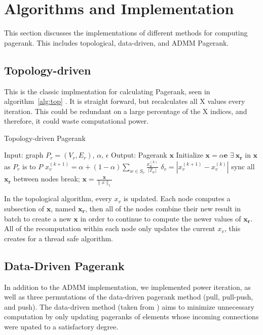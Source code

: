 \documentclass[letterpaper,12pt,onecolumn]{article}
\begin{document}
\section{Algorithms and Implementation}

This section discusses the implementations of different methods for computing pagerank. This includes topological, data-driven, and ADMM Pagerank. 

\subsection{Topology-driven}
This is the classic implmentation for calculating Pagerank, seen in algorithm~\ref{alg:top} . It is straight forward, but recalculates all X values every iteration. This could be redundant on a large percentage of the X indices, and therefore, it could waste computational power. 

\begin{algorithm}
\caption{Topology-driven Pagerank}
\label{alg:top}
\begin{algorithmic}[1]
  \STATE Input: graph $P_{r} = (V_r, E_r)$, $\alpha$, $\epsilon$
  \STATE Output: Pagerank $\mathbf{x}$
  \STATE Initialize $\mathbf{x} = \alpha \mathbf{e}$
  \STATE $\exists  \medspace \mathbf{x_r}$ in $\mathbf{x}$ as $P_r$ is to $P$
		\STATE $x_{v}^{(k+1)} = \alpha + (1 - \alpha) \sum_{w \in S_v} \frac{x_{w}^{(k)}}{|T_w|} $
		\STATE $\delta_{v} = | x_{v}^{(k+1)} - x_{v}^{(k)} | $
	\ENDFOR
	\STATE sync all $\mathbf{x_r}$ between nodes
	\IF{$\|\delta \|_{\infty} < \epsilon$}
		\STATE break;
	\ENDIF
  \ENDWHILE
  \STATE $\mathbf{x} = \frac{\mathbf{x} }{\|x\|_{1}}$
\end{algorithmic}
\end{algorithm}

In the topological algorithm, every $x_v$ is updated. Each node computes a subsection of $\mathbf{x}$, named $\mathbf{x_r}$, then all of the nodes combine their new result in batch to create a new $\mathbf{x}$ in order to continue to compute the newer values of $\mathbf{x_r}$. All of the recomputation within each node only updates the current $x_v$, this creates for a thread safe algorithm.

\subsection{Data-Driven Pagerank}
In addition to the ADMM implementation, we implemented power iteration, as well as three permutations of the data-driven pagerank method (pull, pull-push, and push). The data-driven method (taken from \cite{Joyce}) aims to minimize unnecessary computation by only updating pageranks of elements whose incoming connections were upated to a satisfactory degree. 
\end{document}
